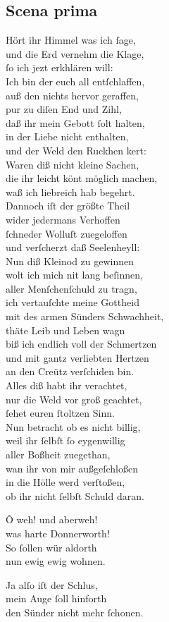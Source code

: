 \documentclass{ees}
\newenvironment{lyrics}[1]{%
  \subsection{#1}\nopagebreak%
  \begin{lyricslist}%
  \let\voice\item%
}{%
  \end{lyricslist}%
}
\begin{document}
\begin{lyrics}{Scena prima}
  \voice[Judex]
  Hört ihr Himmel was ich ſage,\\
  und die Erd vernehm die Klage,\\
  ſo ich jezt erkhlären will:\\
  Ich bin der euch all entſchlaffen,\\
  auß den nichts hervor geraffen,\\
  pur zu diſen End und Zihl,\\
  daß ihr mein Gebott ſolt halten,\\
  in der Liebe nicht enthalten,\\
  und der Weld den Ruckhen kert:\\
  Waren diß nicht kleine Sachen,\\
  die ihr leicht könt möglich machen,\\
  waß ich liebreich hab begehrt.\\
  Dannoch iſt der größte Theil\\
  wider jedermans Verhoffen\\
  ſchneder Wolluſt zuegeloffen\\
  und verſcherzt daß Seelenheyll:\\
  Nun diß Kleinod zu gewinnen\\
  wolt ich mich nit lang beſinnen,\\
  aller Menſchenſchuld zu tragn,\\
  ich vertauſchte meine Gottheid\\
  mit des armen Sünders Schwachheit,\\
  thäte Leib und Leben wagn\\
  biß ich endlich voll der Schmertzen\\
  und mit gantz verliebten Hertzen\\
  an den Creütz verſchiden bin.\\
  Alles diß habt ihr verachtet,\\
  nur die Weld vor groß geachtet,\\
  ſehet euren ſtoltzen Sinn.\\
  Nun betracht ob es nicht billig,\\
  weil ihr ſelbſt ſo eygenwillig\\
  aller Boßheit zuegethan,\\
  wan ihr von mir außgeſchloßen\\
  in die Hölle werd verſtoßen,\\
  ob ihr nicht ſelbſt Schuld daran.

  \voice[Chorus]
  Ô weh! und aberweh!\\
  was harte Donnerworth!\\
  So ſollen wür aldorth\\
  nun ewig ewig wohnen.

  \voice[Judex]
  Ja alſo iſt der Schlus,\\
  mein Auge ſoll hinforth\\
  den Sünder nicht mehr ſchonen.
\end{lyrics}
\end{document}
